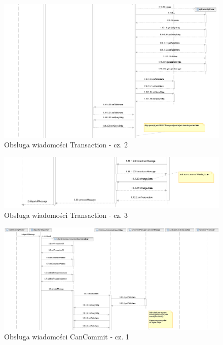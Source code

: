 \documentclass[a4paper, oneside, 11pt]{report}
\begin{document}
\begin{figure}[h]
\centering
\includegraphics[width=22cm,angle=90]{sekwencje/TransactionMessage2.png}
\caption{Obsługa wiadomości Transaction - cz. 2}
\end{figure}

\begin{figure}[h]
\centering
\includegraphics[width=22cm,angle=90]{sekwencje/TransactionMessage3.png}
\caption{Obsługa wiadomości Transaction - cz. 3}
\end{figure}

\begin{figure}[h]
\centering
\includegraphics[width=22cm,angle=90]{sekwencje/CanCommitMessage1.png}
\caption{Obsługa wiadomości CanCommit - cz. 1}
\end{figure}
\end{document}
